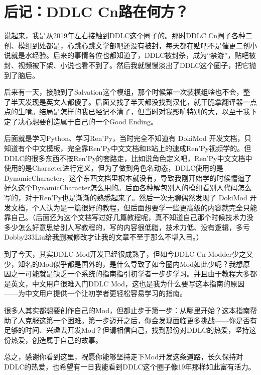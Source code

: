 \chapter{后记：DDLC Cn路在何方？}

说起来，我是从2019年左右接触到DDLC这个圈子的。那时DDLC Cn圈子各种二创、模组到处都是，心跳心跳文学部吧还没有被封，每天都在贴吧不是催更二创小说就是水经验。后来的事情各位也都知道了，DDLC被封杀，成为“禁游”，贴吧被封、视频被下架、小说也看不到了。然后我就慢慢淡出了DDLC这个圈子，把它抛到了脑后。


后来有一天，接触到了Salvation这个模组，那个时候第一次装模组啥也不会，整了半天发现是英文人都傻了。后面又找了半天都没找到汉化，就干脆拿翻译器一点点的生啃。结局是怎样的我已经记不清了，但当时对我影响特别的大，以至于我下定了决心想要创造属于自己的一个Good Ending。


后面就是学习Python、学习Ren'Py，当时完全不知道有 DokiMod 开发文档，只知道有个中文模板，完全靠Ren'Py中文文档和B站上的速成Ren'Py视频学的。但DDLC的很多东西不按Ren'Py的套路走，比如说角色定义吧，Ren'Py中文文档中使用的是Character进行定义，但为了做到角色名动态，DDLC使用的是DynamicCharacter，这个东西文档里根本就没有，导致我刚开始学的时候懵逼了好久这个DynamicCharacter怎么用的。后面各种解包别人的模组看别人代码怎么写的，对于Ren'Py也是渐渐的熟悉起来了。然后一次无聊偶然发现了 DokiMod 开发文档，个人认为是一篇很好的教程，但后面想要学一些更高级的内容就完全只能靠自己。（后面还为这个文档写过好几篇教程呢，真不知道自己那个时候技术力没多少怎么好意思给别人写教程的，写的内容很低脂，技术力低、没有逻辑，多亏Dobby233Liu给我删减修改才让我的文章不至于那么不堪入目。）


到了今天，其实DDLC Mod开发已经很成熟了，但如今DDLC Cn Modder少之又少，知名的Mod似乎都是国外的，是什么导致了如今圈内Mod如此少呢？我想原因之一可能就是缺乏一个系统的指南指引初学者一步步学习。并且由于教程大多都是英文，中文用户很难入门DDLC Mod，这也是我为什么要写这本指南的原因——为中文用户提供一个让初学者更轻松容易学习的指南。

很多人其实都想要创作自己的Mod，但都止步于第一步：从哪里开始？这本指南帮助了人克服这第一个困难。第一步迈开之后，你会发现面临更多挑战——你是否有足够的时间、兴趣去开发Mod？但请相信自己，找到那份对DDLC的热爱，坚持这份热爱，创造属于自己的故事。

总之，感谢你看到这里，祝愿你能够坚持走下Mod开发这条道路，长久保持对DDLC的热爱，也希望有一日我能看到DDLC这个圈子像19年那样如此富有活力。